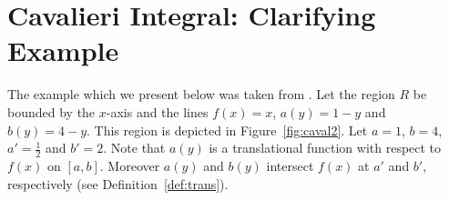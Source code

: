 \documentclass[twoside,reqno,11pt]{fcaa-var} %
\begin{document}
% 




\section{Cavalieri Integral: Clarifying Example}
\label{sec:cav_integral_example}
\noindent
The example which we present below was taken from \cite{ackermann12,grobler19}. Let the region $R$ be bounded by the $x$-axis and the lines $f(x)=x$, $a(y)=1-y$ and $b(y)=4-y$. This region is depicted in Figure~\ref{fig:caval2}. Let $a=1$, $b=4$, $a'=\frac{1}{2}$ and $b'=2$. Note that $a(y)$ is a translational function with respect to $f(x)$ on $[a,b]$. Moreover $a(y)$ and $b(y)$ intersect $f(x)$ at $a'$ and $b'$, respectively (see Definition~\ref{def:trans}).\\
\end{document}
